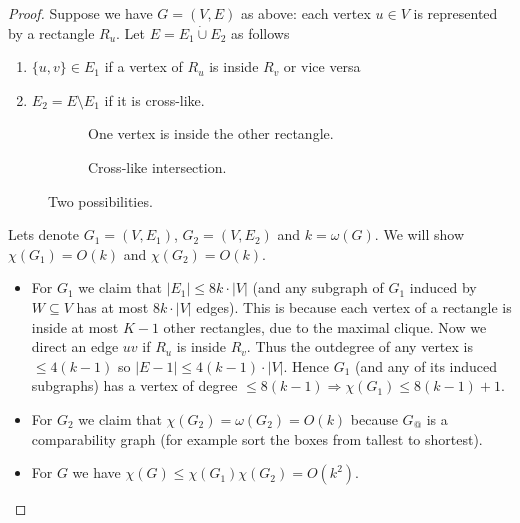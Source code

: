 \begin{proof}
	Suppose we have $G = (V,E)$ as above: each vertex $u \in V$ is represented by a rectangle $R_u$. Let $E = E_1 \dot{\cup} E_2$ as follows
	
	\begin{enumerate}
		\item $\{u,v\} \in E_1$ if a vertex of $R_u$ is inside $R_v$ or vice versa
		\item $E_2 = E \setminus E_1$ if it is cross-like.
	\end{enumerate}
	
	\begin{figure}[!ht]\centering
		\begin{subfigure}{.45\textwidth}\centering
			\caption{One vertex is inside the other rectangle.}
		\end{subfigure}
		\begin{subfigure}{.45\textwidth}\centering
			\caption{Cross-like intersection.}
		\end{subfigure}
		\caption{Two possibilities.}
	\end{figure}
	
	Lets denote $G_1 = (V, E_1)$, $G_2 = (V, E_2)$ and $k = \omega(G)$. We will show $\chi(G_1) = O(k)$ and $\chi(G_2) = O(k)$.
	
	\begin{itemize}
		\item For $G_1$ we claim that $|E_1| \leq 8 k \cdot |V|$ (and any subgraph of $G_1$ induced by $W \subseteq V$ has at most $8 k \cdot |V|$ edges). This is because each vertex of a rectangle is inside at most $K-1$ other rectangles, due to the maximal clique. Now we direct an edge $uv$ if $R_u$ is inside $R_v$. Thus the outdegree of any vertex is $\leq 4 (k-1)$ so $|E-1| \leq 4 (k-1) \cdot |V|$. Hence $G_1$ (and any of its induced subgraphs) has a vertex of degree $\leq 8 (k-1) \Rightarrow \chi(G_1) \leq 8 (k-1) + 1$.
		\item For $G_2$ we claim that $\chi(G_2) = \omega(G_2) = O(k)$ because $G_@$ is a comparability graph (for example sort the boxes from tallest to shortest).
		\item For $G$ we have $\chi(G) \leq \chi(G_1) \chi(G_2) = O(k^2)$.
	\end{itemize}
\end{proof}